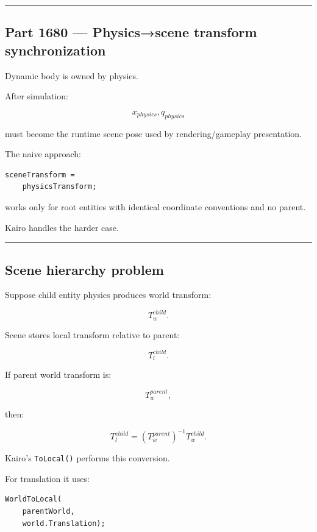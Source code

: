 \begin{center}\rule{0.5\linewidth}{0.5pt}\end{center}

\subsection{Part 1680 --- Physics→scene transform synchronization}\label{06-engine-ii-ch037-part-1680-physicsscene-transform-synchronization}

Dynamic body is owned by physics.

After simulation:

\[
x_{physics},q_{physics}
\]

must become the runtime scene pose used by rendering/gameplay presentation.

The naive approach:

\begin{verbatim}
sceneTransform =
    physicsTransform;
\end{verbatim}

works only for root entities with identical coordinate conventions and no parent.

Kairo handles the harder case.

\begin{center}\rule{0.5\linewidth}{0.5pt}\end{center}

\subsection{Scene hierarchy problem}\label{06-engine-ii-ch037-scene-hierarchy-problem}

Suppose child entity physics produces world transform:

\[
T_w^{child}.
\]

Scene stores local transform relative to parent:

\[
T_l^{child}.
\]

If parent world transform is:

\[
T_w^{parent},
\]

then:

\[
\boxed{
T_l^{child}
=
(T_w^{parent})^{-1}
T_w^{child}.
}
\]

Kairo's \texttt{ToLocal()} performs this conversion.

For translation it uses:

\begin{verbatim}
WorldToLocal(
    parentWorld,
    world.Translation);
\end{verbatim}

